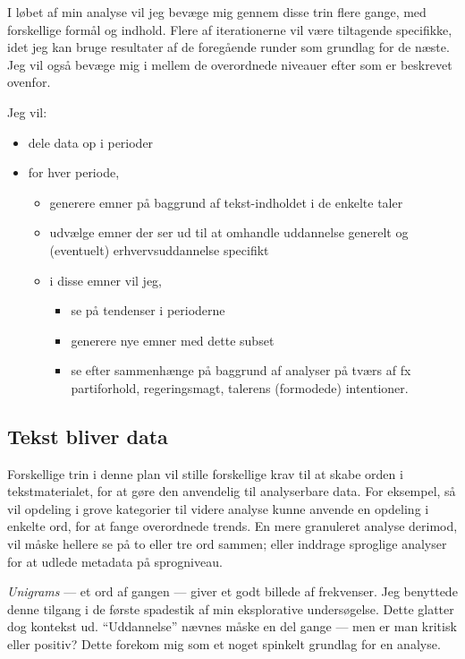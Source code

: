 I løbet af min analyse vil jeg bevæge mig gennem disse trin flere gange, med forskellige formål og indhold.
Flere af iterationerne vil være tiltagende specifikke, idet jeg kan bruge resultater af de foregående runder som grundlag for de næste.
Jeg vil også bevæge mig i mellem de overordnede niveauer efter \autocite{evansMachineTranslationMining2016} som er beskrevet ovenfor.

Jeg vil:

\begin{itemize}


  \item
    dele data op i perioder
  \item
    for hver periode,
    \begin{itemize}
      \item
        generere emner på baggrund af tekst-indholdet i de enkelte taler
      \item
        udvælge emner der ser ud til at omhandle uddannelse generelt og (eventuelt) erhvervsuddannelse specifikt
      \item
        i disse emner vil jeg, 
        \begin{itemize}
          \item
            se på tendenser i perioderne
          \item
            generere nye emner med dette subset
          \item
            se efter sammenhænge på baggrund af analyser på tværs af fx partiforhold, regeringsmagt, talerens (formodede) intentioner.
        \end{itemize}
    \end{itemize}
\end{itemize}

\subsection{Tekst bliver data}

Forskellige trin i denne plan vil stille forskellige krav til at skabe orden i tekstmaterialet, for at gøre den anvendelig til analyserbare data.
For eksempel, så vil opdeling i grove kategorier til videre analyse kunne anvende en opdeling i enkelte ord, for at fange overordnede trends.
En mere granuleret analyse derimod, vil måske hellere se på to eller tre ord sammen; eller inddrage sproglige analyser for at udlede metadata på sprogniveau.

\textit{Unigrams} — et ord af gangen — giver et godt billede af frekvenser.
Jeg benyttede  denne tilgang i de første spadestik af min eksplorative undersøgelse.
Dette glatter dog kontekst ud.
“Uddannelse” nævnes måske en del gange — men er man kritisk eller positiv?
Dette forekom mig som et noget spinkelt grundlag for en analyse.

